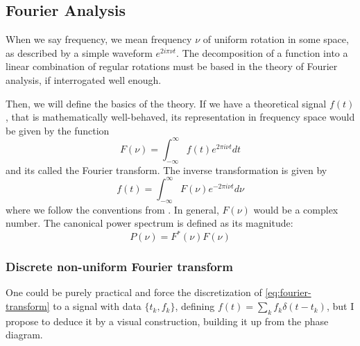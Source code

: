\subsection{Fourier Analysis}

When we say frequency, we mean frequency $\nu$ of uniform rotation in some space, as described by a simple waveform $e^{2i\pi \nu t}$.
The decomposition of a function into a linear combination of regular rotations must be based in the theory of Fourier analysis,
if interrogated well enough. 

Then, we will define the basics of the theory. If we have a theoretical signal $f(t)$, that is mathematically well-behaved,
its representation in frequency space would be given by the function
\begin{equation}
	F(\nu) = \int_{-\infty}^\infty f(t) e^{2\pi i \nu t} dt \label{eq:fourier-transform}
\end{equation}
and its called the Fourier transform. The inverse transformation is given by 
\begin{equation}
	f(t) = \int_{-\infty}^{\infty} F(\nu) e^{-2\pi i \nu t} d\nu
\end{equation}
where we follow the conventions from \cite{Deeming1975}. In general, $F(\nu)$ would be a complex number.
The canonical power spectrum is defined as its magnitude:
\begin{equation}
	P(\nu) = F^\ast(\nu) F(\nu)
\end{equation}


	\subsubsection{Discrete non-uniform Fourier transform}
	
	One could be purely practical and force the discretization of \autoref{eq:fourier-transform} to a signal with data $\{t_k,f_k\}$,
	defining $f(t) = \sum_k f_k \delta(t-t_k)$, but I propose to deduce it by a visual construction, building it up from the phase diagram.
	
